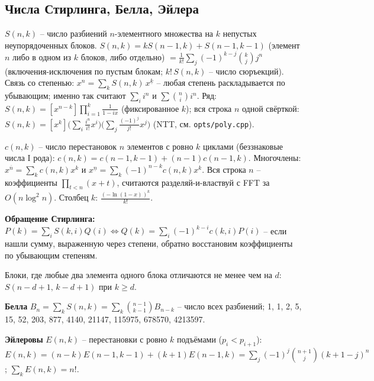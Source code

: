 \subsection{Числа Стирлинга, Белла, Эйлера}
$S(n,k)$ -- число разбиений $n$-элементного множества на $k$ непустых неупорядоченных блоков. $S(n,k)=kS(n{-}1,k)+S(n{-}1,k{-}1)$ (элемент $n$ либо в одном из $k$ блоков, либо отдельно) $=\frac1{k!}\sum_j(-1)^{k-j}\binom kjj^n$ (включения-исключения по пустым блокам; $k!\,S(n,k)$ -- число сюръекций). Связь со степенью: $x^n=\sum_kS(n,k)\,x^{\underline k}$ -- любая степень раскладывается по убывающим; именно так считают $\sum_i i^n$ и $\sum\binom ni i^n$. Ряд: $S(n,k)=[x^{n-k}]\prod_{i=1}^k\frac1{1-ix}$ (фиксированное $k$); вся строка $n$ одной свёрткой: $S(n,k)=[x^k]\big(\sum_i\frac{i^n}{i!}x^i\big)\big(\sum_j\frac{(-1)^j}{j!}x^j\big)$ (NTT, см. \texttt{opts/poly.cpp}).
\par $c(n,k)$ -- число перестановок $n$ элементов с ровно $k$ циклами (беззнаковые числа I рода): $c(n,k)=c(n{-}1,k{-}1)+(n{-}1)c(n{-}1,k)$. Многочлены: $x^{\overline n}=\sum_kc(n,k)x^k$ и $x^{\underline n}=\sum_k(-1)^{n-k}c(n,k)x^k$. Вся строка $n$ -- коэффициенты $\prod_{t<n}(x+t)$, считаются разделяй-и-властвуй с FFT за $O(n\log^2n)$. Столбец $k$: $\frac{(-\ln(1-x))^k}{k!}$.
\par \textbf{Обращение Стирлинга:} $P(k)=\sum_iS(k,i)Q(i)\iff Q(k)=\sum_i(-1)^{k-i}c(k,i)P(i)$ -- если нашли сумму, выраженную через степени, обратно восстановим коэффициенты по убывающим степеням.
\par Блоки, где любые два элемента одного блока отличаются не менее чем на $d$: $S(n{-}d{+}1,\,k{-}d{+}1)$ при $k\ge d$.
\par \textbf{Белла} $B_n=\sum_kS(n,k)=\sum_k\binom{n-1}{k-1}B_{n-k}$ -- число всех разбиений; {\footnotesize 1, 1, 2, 5, 15, 52, 203, 877, 4140, 21147, 115975, 678570, 4213597}.
\par \textbf{Эйлеровы} $E(n,k)$ -- перестановки с ровно $k$ подъёмами ($p_i<p_{i+1}$): $E(n,k)=(n{-}k)E(n{-}1,k{-}1)+(k{+}1)E(n{-}1,k)=\sum_j(-1)^j\binom{n+1}j(k{+}1{-}j)^n$; $\sum_kE(n,k)=n!$.
